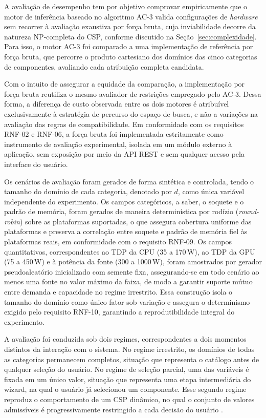A avaliação de desempenho tem por objetivo comprovar empiricamente que o motor de
inferência baseado no algoritmo AC-3 valida configurações de \textit{hardware} sem recorrer à
avaliação exaustiva por força bruta, cuja inviabilidade decorre da natureza NP-completa do
CSP, conforme discutido na Seção~\ref{sec:complexidade}. Para isso, o motor AC-3 foi
comparado a uma implementação de referência por força bruta, que percorre o produto
cartesiano dos domínios das cinco categorias de componentes, avaliando cada atribuição
completa candidata.

Com o intuito de assegurar a equidade da comparação, a implementação por força bruta
reutiliza o mesmo avaliador de restrições empregado pelo AC-3. Dessa forma, a diferença de
custo observada entre os dois motores é atribuível exclusivamente à estratégia de percurso
do espaço de busca, e não a variações na avaliação das regras de compatibilidade. Em
conformidade com os requisitos RNF-02 e RNF-06, a força bruta foi implementada estritamente
como instrumento de avaliação experimental, isolada em um módulo externo à aplicação, sem
exposição por meio da API REST e sem qualquer acesso pela interface do usuário.

Os cenários de avaliação foram gerados de forma sintética e controlada, tendo o tamanho do
domínio de cada categoria, denotado por $d$, como única variável independente do
experimento. Os campos categóricos, a saber, o soquete e o padrão de memória, foram gerados
de maneira determinística por rodízio (\textit{round-robin}) sobre as plataformas
suportadas, o que assegura cobertura uniforme das plataformas e preserva a correlação entre
soquete e padrão de memória fiel às plataformas reais, em conformidade com o requisito
RNF-09. Os campos quantitativos, correspondentes ao TDP da CPU (35 a 170\,W), ao TDP da GPU
(75 a 450\,W) e à potência da fonte (300 a 1000\,W), foram amostrados por gerador
pseudoaleatório inicializado com semente fixa, assegurando-se em todo cenário ao menos uma
fonte no valor máximo da faixa, de modo a garantir suporte mútuo entre demanda e capacidade
no regime irrestrito. Essa construção isola o tamanho do domínio como único fator sob
variação e assegura o determinismo exigido pelo requisito RNF-10, garantindo a
reprodutibilidade integral do experimento.

A avaliação foi conduzida sob dois regimes, correspondentes a dois momentos distintos da
interação com o sistema. No regime irrestrito, os domínios de todas as categorias
permanecem completos, situação que representa o catálogo antes de qualquer seleção do
usuário. No regime de seleção parcial, uma das variáveis é fixada em um único valor,
situação que representa uma etapa intermediária do wizard, na qual o usuário já selecionou
um componente. Esse segundo regime reproduz o comportamento de um CSP dinâmico, no qual o
conjunto de valores admissíveis é progressivamente restringido a cada decisão do usuário
\cite{Mittal1989}.


